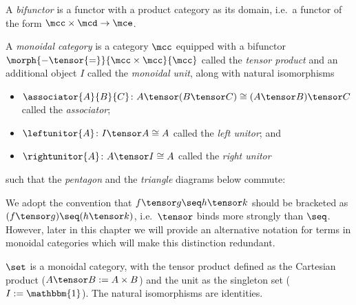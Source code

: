 \begin{definition}[Bifunctor]
    A \emph{bifunctor} is a functor with a product category as its domain, i.e.\
    a functor of the form \(\mcc \times \mcd \to \mce\).
\end{definition}

\begin{definition}
    \label{def:monoidal-category}
    A \emph{monoidal category} is a category \(\mcc\) equipped with a
    bifunctor \(\morph{{-} \tensor {=}}{\mcc \times \mcc}{\mcc}\) called the
    \emph{tensor product} and an additional object \(I\) called the
    \emph{monoidal unit},
    along with natural isomorphisms
    \begin{itemize}
        \item \(
            \associator{A}{B}{C}
            \colon
            A \tensor (B \tensor C)
            \cong
            (A \tensor B) \tensor C
            \) called the \emph{associator};
        \item \(
            \leftunitor{A}
            \colon
            I \tensor A
            \cong
            A
            \) called the \emph{left unitor}; and
        \item \(
            \rightunitor{A}
            \colon
            A \tensor I
            \cong
            A
            \) called the \emph{right unitor}
    \end{itemize}
    such that the \emph{pentagon} and the \emph{triangle} diagrams below
    commute:
    \begin{center}
        

        \vspace{1em}

        
    \end{center}
\end{definition}

We adopt the convention that \(f \tensor g \seq h \tensor k\) should be
bracketed as \((f \tensor g) \seq (h \tensor k)\), i.e.\ \(\tensor\) binds
more strongly than \(\seq\).
However, later in this chapter we will provide an alternative notation for terms
in monoidal categories which will make this distinction redundant.

\begin{example}
    \(\set\) is a monoidal category, with the tensor product defined as the
    Cartesian product (\(A \tensor B := A \times B\)) and the unit as the
    singleton set (\(I := \mathbbm{1}\)).
    The natural isomorphisms are identities.
\end{example}

